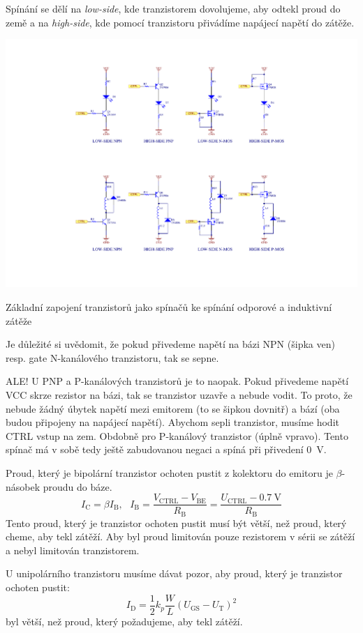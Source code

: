 \documentclass[a4paper,12pt]{article}   %
\begin{document}
Spínání se dělí na \textit{low-side}, kde tranzistorem dovolujeme, aby odtekl proud do země a na \textit{high-side}, kde pomocí tranzistoru přivádíme napájecí napětí do zátěže.

\begin{schema}[h!]
    \centering
    \includegraphics[width=.9\textwidth]{tranzistory-spinace.pdf}
    \caption{Základní zapojení tranzistorů jako spínačů ke spínání odporové a induktivní zátěže}
\end{schema}
Je důležité si uvědomit, že pokud přivedeme napětí na bázi NPN (šipka ven) resp. gate N-kanálového tranzistoru, tak se sepne. 

ALE! U PNP a P-kanálových tranzistorů je to naopak. Pokud přivedeme napětí VCC skrze rezistor na bázi, tak se tranzistor uzavře a nebude vodit. To proto, že nebude žádný úbytek napětí mezi emitorem (to se šipkou dovnitř) a bází (oba budou připojeny na napájecí napětí). Abychom sepli tranzistor, musíme hodit CTRL vstup na zem. Obdobně pro P-kanálový tranzistor (úplně vpravo). Tento spínač má v sobě tedy ještě zabudovanou negaci a spíná při přivedení 0~V.

Proud, který je bipolární tranzistor ochoten pustit z kolektoru do emitoru je $\beta$-násobek proudu do báze.
\begin{equation*}
    I_\text{C} = \beta I_\text{B}, ~~~I_\text{B} = \frac{V_\text{CTRL} - V_\text{BE}}{R_\text{B}} = \frac{U_\text{CTRL} - 0.7~\text{V}}{R_\text{B}}
\end{equation*}
Tento proud, který je tranzistor ochoten pustit musí být větší, než proud, který cheme, aby tekl zátěží. Aby byl proud limitován pouze rezistorem v sérii se zátěží a nebyl limitován tranzistorem.

U unipolárního tranzistoru musíme dávat pozor, aby proud, který je tranzistor ochoten pustit:
\begin{equation*}
    I_\text{D} = \frac{1}{2}k_p \frac{W}{L} (U_\text{GS} - U_\text{T})^2
\end{equation*}
byl větší, než proud, který požadujeme, aby tekl zátěží.
\end{document}
